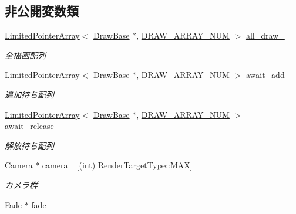 \subsection*{非公開変数類}
\begin{DoxyCompactItemize}
\item 
\mbox{\hyperlink{class_limited_pointer_array}{Limited\+Pointer\+Array}}$<$ \mbox{\hyperlink{class_draw_base}{Draw\+Base}} $\ast$, \mbox{\hyperlink{class_draw_manager_ad4326cddcb1cc4cec198c4f8069b81f0}{D\+R\+A\+W\+\_\+\+A\+R\+R\+A\+Y\+\_\+\+N\+UM}} $>$ \mbox{\hyperlink{class_draw_manager_a328d73b404a5609d3e89a299362253fd}{all\+\_\+draw\+\_\+}}
\begin{DoxyCompactList}\small\item\em 全描画配列 \end{DoxyCompactList}\item 
\mbox{\hyperlink{class_limited_pointer_array}{Limited\+Pointer\+Array}}$<$ \mbox{\hyperlink{class_draw_base}{Draw\+Base}} $\ast$, \mbox{\hyperlink{class_draw_manager_ad4326cddcb1cc4cec198c4f8069b81f0}{D\+R\+A\+W\+\_\+\+A\+R\+R\+A\+Y\+\_\+\+N\+UM}} $>$ \mbox{\hyperlink{class_draw_manager_aa6a8468dd4469cde2cf162b91a5c1faf}{await\+\_\+add\+\_\+}}
\begin{DoxyCompactList}\small\item\em 追加待ち配列 \end{DoxyCompactList}\item 
\mbox{\hyperlink{class_limited_pointer_array}{Limited\+Pointer\+Array}}$<$ \mbox{\hyperlink{class_draw_base}{Draw\+Base}} $\ast$, \mbox{\hyperlink{class_draw_manager_ad4326cddcb1cc4cec198c4f8069b81f0}{D\+R\+A\+W\+\_\+\+A\+R\+R\+A\+Y\+\_\+\+N\+UM}} $>$ \mbox{\hyperlink{class_draw_manager_a59fa29ded26b3609545a04b5c6927824}{await\+\_\+release\+\_\+}}
\begin{DoxyCompactList}\small\item\em 解放待ち配列 \end{DoxyCompactList}\item 
\mbox{\hyperlink{class_camera}{Camera}} $\ast$ \mbox{\hyperlink{class_draw_manager_a7180376f029c4ce998dfa83edfc0343e}{camera\+\_\+}} \mbox{[}(int) \mbox{\hyperlink{class_draw_manager_a7ade407aee706c02454da2e53a559c9ca26a4b44a837bf97b972628509912b4a5}{Render\+Target\+Type\+::\+M\+AX}}\mbox{]}
\begin{DoxyCompactList}\small\item\em カメラ群 \end{DoxyCompactList}\item 
\mbox{\hyperlink{class_fade}{Fade}} $\ast$ \mbox{\hyperlink{class_draw_manager_a0b286f02c47cc483bc13ec171079027f}{fade\+\_\+}}

\end{DoxyCompactItemize}
